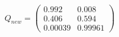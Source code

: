 \documentclass{article}
\begin{document}
\begin{enumerate}[label=(\alph*),resume]
\begin{mdframed}[backgroundcolor=lightgray]
\[ Q_{new} = \left( \begin{array}{cc}
0.992 & 0.008 \\
0.406 & 0.594 \\
0.00039 & 0.99961 \end{array} \right)\] 
\end{mdframed}

\end{enumerate}

{\small


}
\end{document}
